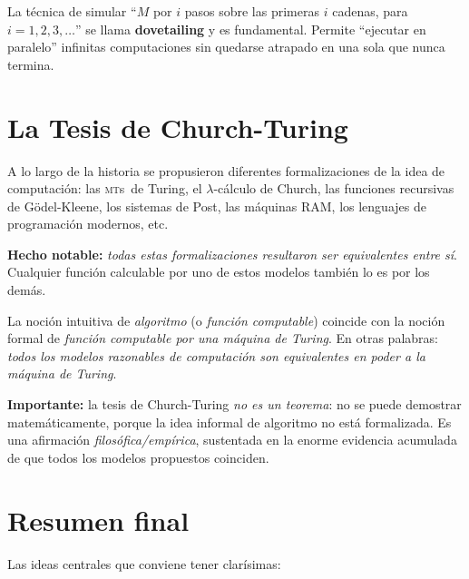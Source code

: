 \documentclass[11pt,a4paper]{article}
\theoremstyle{definicion}
\newcommand{\MTs}{\textsc{mt}s}
\begin{document}
\begin{idea}
La técnica de simular ``$M$ por $i$ pasos sobre las primeras $i$ cadenas, para $i = 1, 2, 3, \dots$'' se llama \textbf{dovetailing} y es fundamental. Permite ``ejecutar en paralelo'' infinitas computaciones sin quedarse atrapado en una sola que nunca termina.
\end{idea}

\section{La Tesis de Church-Turing}

A lo largo de la historia se propusieron diferentes formalizaciones de la idea de computación: las \MTs\ de Turing, el $\lambda$-cálculo de Church, las funciones recursivas de Gödel-Kleene, los sistemas de Post, las máquinas RAM, los lenguajes de programación modernos, etc.

\textbf{Hecho notable:} \emph{todas estas formalizaciones resultaron ser equivalentes entre sí}. Cualquier función calculable por uno de estos modelos también lo es por los demás.

\begin{tcolorbox}[colback=yellow!10!white, colframe=orange!70!black, title=\textbf{Tesis de Church-Turing}, fonttitle=\bfseries]
La noción intuitiva de \emph{algoritmo} (o \emph{función computable}) coincide con la noción formal de \emph{función computable por una máquina de Turing}. En otras palabras: \emph{todos los modelos razonables de computación son equivalentes en poder a la máquina de Turing}.
\end{tcolorbox}

\textbf{Importante:} la tesis de Church-Turing \emph{no es un teorema}: no se puede demostrar matemáticamente, porque la idea informal de algoritmo no está formalizada. Es una afirmación \emph{filosófica/empírica}, sustentada en la enorme evidencia acumulada de que todos los modelos propuestos coinciden.

\section{Resumen final}

Las ideas centrales que conviene tener clarísimas:
\end{document}

